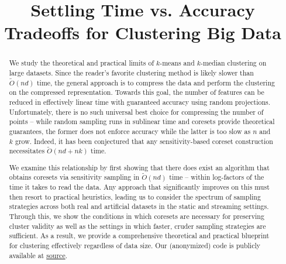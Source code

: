 \documentclass[sigconf]{acmart}
\title{Settling Time vs. Accuracy Tradeoffs for Clustering Big Data}
\author{}
\theoremstyle{plain}
\theoremstyle{definition}
\theoremstyle{remark}
\begin{document}
\begin{abstract}
We study the theoretical and practical limits of $k$-means and $k$-median clustering on large datasets. Since the reader's favorite clustering method is likely
slower than $\tilde{O}(nd)$ time, the general approach is to compress the data and perform the clustering on the compressed representation. Towards this goal,
the number of features can be reduced in effectively linear time with guaranteed accuracy using random projections. Unfortunately, there is no such universal
best choice for compressing the number of points -- while random sampling runs in sublinear time and coresets provide theoretical guarantees, the former does
not enforce accuracy while the latter is too slow as $n$ and $k$ grow. Indeed, it has been conjectured that any sensitivity-based coreset construction
necessitates $\tilde{O}(nd + nk)$ time.

We examine this relationship by first showing that there does exist an algorithm that obtains coresets via sensitivity sampling in $\tilde{O}(nd)$ time --
within log-factors of the time it takes to read the data.  Any approach that significantly improves on this must then resort to practical heuristics, leading us
to consider the spectrum of sampling strategies across both real and artificial datasets in the static and streaming settings. Through this, we show the
conditions in which coresets are necessary for preserving cluster validity as well as the settings in which faster, cruder sampling strategies are sufficient.
As a result, we provide a comprehensive theoretical and practical blueprint for clustering effectively regardless of data size.  Our (anonymized) code is
publicly available at \textcolor{blue}{\href{https://anonymous.4open.science/r/Fast-Coreset-Generation-7564}{source}}.
\end{abstract}

\maketitle




%

%









\appendix

\end{document}
